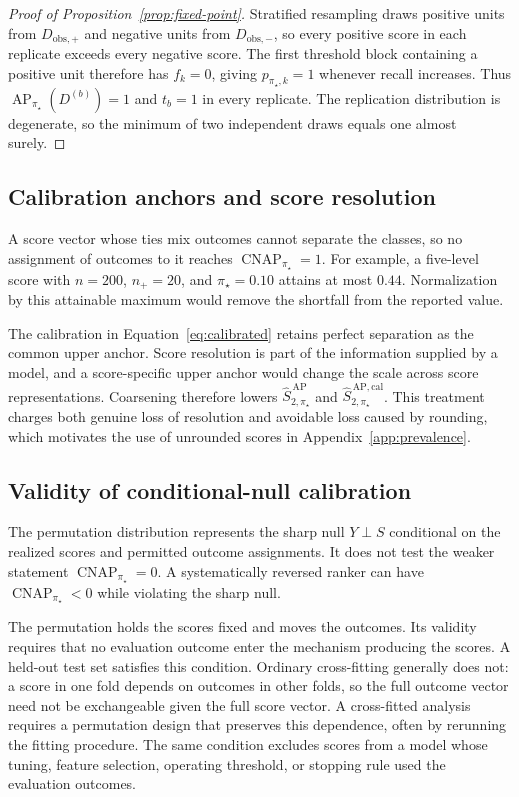\documentclass[11pt]{article}
\newcommand{\AP}{\operatorname{AP}}
\newcommand{\CNAP}{\operatorname{CNAP}}
\newcommand{\Tpi}{\CNAP_{\pi_\star}}
\newcommand{\SAPHat}{\widehat S_{2,\pi_\star}^{\,\mathrm{AP}}}
\newcommand{\SAPcalHat}{\widehat S_{2,\pi_\star}^{\,\mathrm{AP,cal}}}
\theoremstyle{remark}
\begin{document}
\begin{proof}[Proof of Proposition~\ref{prop:fixed-point}]
Stratified resampling draws positive units from $D_{\mathrm{obs},+}$ and negative units from $D_{\mathrm{obs},-}$, so every positive score in each replicate exceeds every negative score. The first threshold block containing a positive unit therefore has $f_k=0$, giving $p_{\pi_\star,k}=1$ whenever recall increases. Thus $\AP_{\pi_\star}(D^{(b)})=1$ and $t_b=1$ in every replicate. The replication distribution is degenerate, so the minimum of two independent draws equals one almost surely.
\end{proof}

\subsection{Calibration anchors and score resolution}
\label{app:calibration-details}

A score vector whose ties mix outcomes cannot separate the classes, so no assignment of outcomes to it reaches $\Tpi=1$. For example, a five-level score with $n=200$, $n_+=20$, and $\pi_\star=0.10$ attains at most $0.44$. Normalization by this attainable maximum would remove the shortfall from the reported value.

The calibration in Equation~\eqref{eq:calibrated} retains perfect separation as the common upper anchor. Score resolution is part of the information supplied by a model, and a score-specific upper anchor would change the scale across score representations. Coarsening therefore lowers $\SAPHat$ and $\SAPcalHat$. This treatment charges both genuine loss of resolution and avoidable loss caused by rounding, which motivates the use of unrounded scores in Appendix~\ref{app:prevalence}.

\subsection{Validity of conditional-null calibration}
\label{app:conditional-validity}

The permutation distribution represents the sharp null $Y\perp S$ conditional on the realized scores and permitted outcome assignments. It does not test the weaker statement $\CNAP_{\pi_\star}=0$. A systematically reversed ranker can have $\CNAP_{\pi_\star}<0$ while violating the sharp null.

The permutation holds the scores fixed and moves the outcomes. Its validity requires that no evaluation outcome enter the mechanism producing the scores. A held-out test set satisfies this condition. Ordinary cross-fitting generally does not: a score in one fold depends on outcomes in other folds, so the full outcome vector need not be exchangeable given the full score vector. A cross-fitted analysis requires a permutation design that preserves this dependence, often by rerunning the fitting procedure. The same condition excludes scores from a model whose tuning, feature selection, operating threshold, or stopping rule used the evaluation outcomes.
\end{document}
